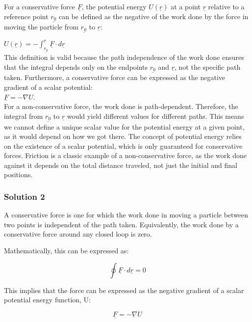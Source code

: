 \documentclass{article}
\begin{document}
For a conservative force $\underline{F}$, the potential energy $U(\underline{r})$ at a point $\underline{r}$ relative to a reference point $\underline{r_0}$ can be defined as the negative of the work done by the force in moving the particle from $\underline{r_0}$ to $\underline{r}$:

$U(\underline{r}) = - \int_{\underline{r_0}}^{\underline{r}} \underline{F} \cdot d\underline{r}$
\\
This definition is valid because the path independence of the work done ensures that the integral depends only on the endpoints $\underline{r_0}$ and $\underline{r}$, not the specific path taken. Furthermore, a conservative force can be expressed as the negative gradient of a scalar potential:
\\

$\underline{F} = - \nabla U$.
\\

For a non-conservative force, the work done is path-dependent. Therefore, the integral from $\underline{r_0}$ to $\underline{r}$ would yield different values for different paths. This means we cannot define a unique scalar value for the potential energy at a given point, as it would depend on how we got there. The concept of potential energy relies on the existence of a scalar potential, which is only guaranteed for conservative forces. Friction is a classic example of a non-conservative force, as the work done against it depends on the total distance traveled, not just the initial and final positions.


\subsubsection{Solution 2}
A conservative force is one for which the work done in moving a particle between two points is independent of the path taken. Equivalently, the work done by a conservative force around any closed loop is zero.

Mathematically, this can be expressed as:

\begin{equation}
\oint \underline{F} \cdot d\underline{r} = 0
\end{equation}

This implies that the force can be expressed as the negative gradient of a scalar potential energy function, U:

\begin{equation}
\underline{F} = -\nabla U
\end{equation}
\end{document}
